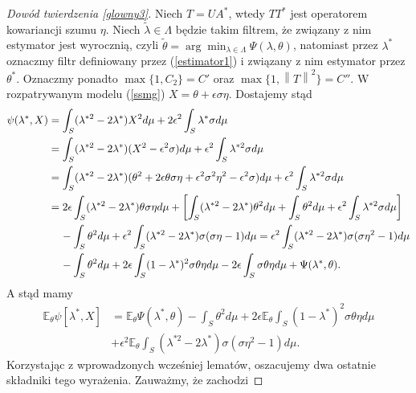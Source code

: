 \documentclass[man,mfiu]{mgrwms}
\newcommand{\norm}[1]{\left\lVert#1\right\rVert}
\begin{document}
\begin{proof}[Dowód twierdzenia \ref{glowny3}]
Niech $T=UA^*$, wtedy $TT^*$ jest operatorem kowariancji szumu $\eta$. Niech $\tilde{\lambda}\in \Lambda$ będzie takim filtrem, że związany z nim estymator jest wyrocznią, czyli $\tilde{\theta}=\arg \min_{\lambda\in \Lambda}\Psi(\lambda,\theta)$, natomiast przez $\lambda^*$ oznaczmy filtr definiowany przez (\ref{estimator1}) i związany z nim estymator przez $\theta^*$. Oznaczmy ponadto $\max\{1,C_2\}=C'$ oraz $\max\{1,\norm{T}^2\}=C''$.
W rozpatrywanym modelu (\ref{ssmg}) $X=\theta+\epsilon\sigma\eta$. Dostajemy stąd
\begin{displaymath}
\begin{split}
\psi(\lambda^*,X)&=\int_S(\lambda^{*2}-2\lambda^*)X^2d\mu+2\epsilon^2\int_S\lambda^*\sigma d\mu\\
&=\int_S(\lambda^{*2}-2\lambda^*)(X^2-\epsilon^2\sigma)d\mu+\epsilon^2\int_S\lambda^{*2}\sigma d\mu\\
&=\int_S(\lambda^{*2}-2\lambda^*)(\theta^2+2\epsilon\theta\sigma\eta+\epsilon^2\sigma^2\eta^2-\epsilon^2\sigma)d\mu+\epsilon^2\int_S\lambda^{*2}\sigma d\mu\\
&=2\epsilon\int_S(\lambda^{*2}-2\lambda^*)\theta\sigma\eta d\mu+\left[\int_S(\lambda^{*2}-2\lambda^*)\theta^2d\mu+\int_S\theta^2d\mu+\epsilon^2\int_S\lambda^{*2}\sigma d\mu\right]\\&\hspace{4mm} -\int_S\theta^2d\mu+\epsilon^2\int_S(\lambda^{*2}-2\lambda^*)\sigma(\sigma\eta-1)d\mu=\epsilon^2\int_S(\lambda^{*2}-2\lambda^*)\sigma(\sigma\eta^2-1)d\mu\\
&\hspace{4mm}-\int_S\theta^2d\mu+2\epsilon\int_S(1-\lambda^*)^2\sigma\theta\eta d\mu -2\epsilon\int_S\sigma\theta\eta d\mu+\Psi(\lambda^*,\theta).
\end{split}
\end{displaymath}
A stąd mamy
\begin{displaymath}
\begin{split}
\mathbb{E}_{\theta}\psi[\lambda^*,X]&=\mathbb{E}_{\theta}\Psi(\lambda^*,\theta)-\int_S\theta ^2d\mu+2\epsilon\mathbb{E}_{\theta}\int_S(1-\lambda^*)^2\sigma \theta \eta d\mu\\
&+\epsilon^2\mathbb{E}_{\theta}\int_S(\lambda^{*2}-2\lambda^*)\sigma(\sigma\eta^2-1)d\mu.
\end{split}
\end{displaymath}
Korzystając z wprowadzonych wcześniej lematów, oszacujemy dwa ostatnie składniki tego wyrażenia. Zauważmy, że zachodzi

\end{proof}
\end{document}
